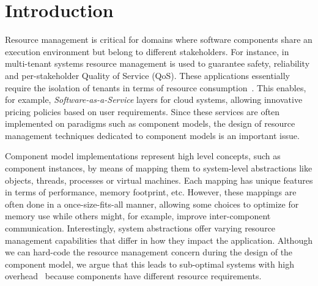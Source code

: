 \section{Introduction}

Resource management is critical for domains where software components share an execution environment but belong to different stakeholders.
For instance, in multi-tenant systems resource management is used to guarantee safety, reliability and per-stakeholder Quality of Service (QoS).
These applications essentially require the isolation of tenants in terms of resource consumption~\cite{KrWeKo2013-icwe-MTBenchmark}.
This enables, for example, \textit{Software-as-a-Service} layers for cloud systems, allowing innovative pricing policies based on user requirements. %
Since these services are often implemented on paradigms such as component models,
the design of resource management techniques dedicated to component models is an important issue.

Component model implementations represent high level concepts, such as component instances, by means of mapping them to system-level abstractions like objects, threads, processes or virtual machines.
Each mapping has unique features in terms of performance, memory footprint, etc.
However, these mappings are often done in a once-size-fits-all manner, allowing some choices to optimize for memory use while others might, for example, improve inter-component communication.
Interestingly, system abstractions offer varying resource management capabilities that differ in how they impact the application.
Although we can hard-code the resource management concern during the design of the component model, we argue that this leads to sub-optimal systems with high  overhead~\cite{binder_portable_2006,czajkowski_jres:_1998,Maurel:2012:AME:2304736.2304763} because components have different resource requirements.

